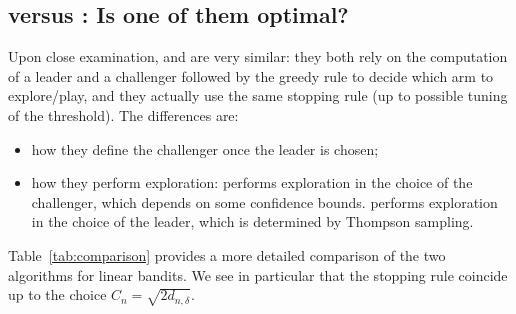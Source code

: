 \subsection{\texorpdfstring{\LGapE}{} versus \texorpdfstring{\LTCCG}{}: Is one of them optimal?}\label{sec:lgc.bayesian.check}

Upon close examination, \LGapE and \LTCCG are very similar: they both rely on the computation of a leader and a challenger followed by the greedy rule to decide which arm to explore/play, and they actually use the same stopping rule (up to possible tuning of the threshold). The differences are:
\begin{itemize}
    \item how they define the challenger once the leader is chosen;
    \item how they perform exploration: \LGapE{} performs exploration in the choice of the challenger, which depends on some confidence bounds. \LTCCG{} performs exploration in the choice of the leader, which is determined by Thompson sampling.  
\end{itemize}

Table~\ref{tab:comparison} provides a more detailed comparison of the two algorithms for linear bandits. We see in particular that the stopping rule coincide up to the choice $C_n = \sqrt{2d_{n,\delta}}$.

